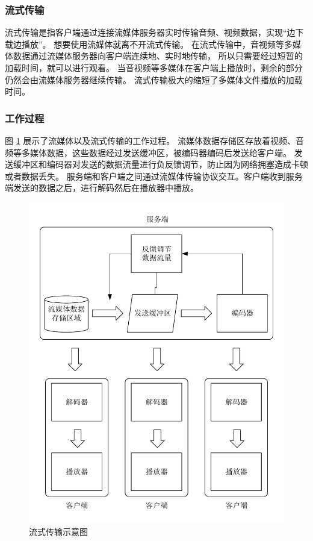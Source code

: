 \subsubsection{流式传输}
流式传输是指客户端通过连接流媒体服务器实时传输音频、视频数据，实现“边下载边播放”。
想要使用流媒体就离不开流式传输。
在流式传输中，音视频等多媒体数据通过流媒体服务器向客户端连续地、实时地传输，
所以只需要经过短暂的加载时间，就可以进行观看\cite{贺雪晨2008多媒体技术实用教程}。
当音视频等多媒体在客户端上播放时，剩余的部分仍然会由流媒体服务器继续传输。
流式传输极大的缩短了多媒体文件播放的加载时间。

\subsubsection{工作过程}
图 \ref{Fig:server} 展示了流媒体以及流式传输的工作过程。
流媒体数据存储区存放着视频、音频等多媒体数据，这些数据经过发送缓冲区，被编码器编码后发送给客户端。
发送缓冲区和编码器对发送的数据流量进行负反馈调节，防止因为网络拥塞造成卡顿或者数据丢失。
服务端和客户端之间通过流媒体传输协议交互。客户端收到服务端发送的数据之后，进行解码然后在播放器中播放。

\begin{figure}[ht]
    \centering
    \includegraphics[width=.9\linewidth]{./Figure/IMG_server.pdf}
    \caption{流式传输示意图}
    \label{Fig:server}
\end{figure}

